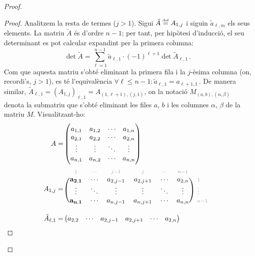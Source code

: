 \begin{teo}
\begin{proof}
\begin{lema}
\begin{adjustwidth}{0.8cm}{}
\begin{proof}
		Analitzem la resta de termes ($j>1$). Sigui $\tilde{A} \stackrel{\text{\tiny def}}{=} A_{1,j}$ i siguin $\tilde{a}_{\ell,m}$ els seus elements. La matriu $\tilde{A}$ és d'ordre $n-1$; per tant, per hipòtesi d'inducció, el seu determinant es pot calcular expandint per la primera columna: 
		\begin{equation}\label{eq:subdet}
			\det \tilde{A} = \sum_{\ell=1}^{n-1}\tilde{a}_{\ell,1}\cdot (-1)^{\ell+1}\det \tilde{A}_{\ell,1}\,. 
		\end{equation} 
		Com que aquesta matriu s'obté eliminant la primera fila i la $j$-èsima columna (on, recordi's, $j>1$), es té l'equivalència $\forall \ell \le n-1 : {\tilde{a}_{\ell,1} = a_{\ell+1,1}}\,$. De manera similar, $\tilde{A}_{\ell,1} = (A_{1,j})_{\ell,1}= A_{(1,\ell+1),(j,1)}$, on la notació $M_{(a,b),(\alpha,\beta)}$ denota la submatriu que s'obté eliminant les files $a$, $b$ i les columnes $\alpha$, $\beta$ de la matriu $M$. Visualitzant-ho:
		\begin{equation*}
			\begin{split}
			A =&
			\begin{pmatrix}
				a_{1,1}&	a_{1,2}&	\cdots&		a_{1,n}\\
				a_{2,1}&	a_{2,2}&	\cdots&		a_{2,n}\\
				\vdots&		\vdots&		\ddots&		\vdots\\
				a_{n,1}&	a_{n,2}&	\cdots&		a_{n,n}
			\end{pmatrix}\\
%
			A_{1,j} =&\
			\begin{blockarray}{rcccccc}
			\begin{block}{*{7}{>{\scriptstyle\color[gray]{0.6}}c<{}}}
				1&	\cdots&	 j-1&	j&	\cdots&	n-1 &\\
			\end{block}
			\begin{block}{(cccccc)*{1}{>{\scriptstyle\color[gray]{0.6}}l<{}}}
				\mathbf{a_{2,1}}&\cdots&a_{2,j-1}&a_{2,j+1}&\cdots&		a_{2,n}& 1\\
				\vdots&	   \ddots&	\vdots&	\vdots&	\ddots&		\vdots& \vdots\\
				\mathbf{a_{n,1}}&   \cdots&	a_{n,j-1}&	a_{n,j+1}&	\cdots&		a_{n,n}&	n-1\\
			\end{block}
			\end{blockarray}\\
%
			\tilde{A}_{\ell,1} =&
			\begin{pmatrix}
				a_{2,2}&\cdots&a_{2,j-1}&a_{2,j+1}&\cdots&		a_{2,n}\\

\end{pmatrix}
\end{split}
\end{equation*}
\end{proof}
\end{adjustwidth}
\end{lema}
\end{proof}
\end{teo}
